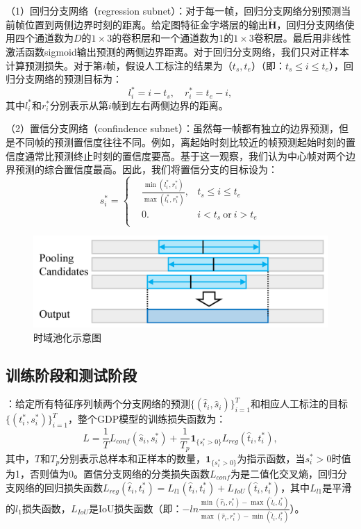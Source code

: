 （1）回归分支网络（regression subnet）：对于每一帧，回归分支网络分别预测当前帧位置到两侧边界时刻的距离。给定图特征金字塔层的输出$\tilde{\bm{H}}$，回归分支网络使用四个通道数为$D$的$1\times3$的卷积层和一个通道数为1的$1\times3$卷积层。最后用非线性激活函数sigmoid输出预测的两侧边界距离。对于回归分支网络，我们只对正样本计算预测损失。对于第$i$帧，假设人工标注的结果为（$t_s, t_e$）（即：$t_s \leq i \leq t_e$），回归分支网络的预测目标为：
\begin{equation}
    l^*_i = i - t_s, \quad r^*_i = t_e - i,
\end{equation}
其中$l^*_i$和$r^*_i$分别表示从第$i$帧到左右两侧边界的距离。

（2）置信分支网络（confindence subnet）：虽然每一帧都有独立的边界预测，但是不同帧的预测置信度往往不同。例如，离起始时刻比较近的帧预测起始时刻的置信度通常比预测终止时刻的置信度要高。基于这一观察，我们认为中心帧对两个边界预测的综合置信度最高。因此，我们将置信分支的目标设为：
\begin{equation}
s^*_i=\left\{
    \begin{aligned}
        & \frac{\min(l^*_i, r^*_i)}{\max(l^*_i, r^*_i)}, & t_s \leq i \leq t_e \\
        & 0.  & i < t_s ~\text{or}~ i > t_e \\
    \end{aligned}
    \right.
\end{equation}

\begin{figure}[t]
    \centering
    \includegraphics[width=0.8\linewidth]{chapter6/res/temporal_pooling.pdf}
    \caption{时域池化示意图}
    \label{ch6:fig:temporal_pooling}
\end{figure}

\subsection{训练阶段和测试阶段}

\textbf{}：给定所有特征序列帧两个分支网络的预测$\{(\hat{t}_i, \hat{s}_i)\}^T_{i=1}$和相应人工标注的目标$\{(t^*_i, s^*_i)\}^T_{i=1}$，整个GDP模型的训练损失函数为：
\begin{equation}
    L = \frac{1}{T}L_{conf}(\hat{s}_i, s^*_i) + \frac{1}{T_p}\mathbf{1}_{\{s^*_i>0\}}L_{reg}(\hat{t}_i, t^*_i),
\end{equation}
其中，$T$和$T_p$分别表示总样本和正样本的数量，$\mathbf{1}_{\{s^*_i>0\}}$为指示函数，当$s^*_i>0$时值为1，否则值为0。置信分支网络的分类损失函数$L_{conf}$为是二值化交叉熵，回归分支网络的回归损失函数$L_{reg}(\hat{t}_i, t^*_i) = L_{l1}(\hat{t}_i, t^*_i) + L_{IoU}(\hat{t}_i, t^*_i)$，其中$L_{l1}$是平滑的$l_1$损失函数，$L_{IoU}$是IoU损失函数（即：$-ln\frac{\min(\hat{r}_i, r^*_i)-\max(\hat{l}_i, l^*_i)}{\max(\hat{r}_i, r^*_i)-\min(\hat{l}_i, l^*_i)}$）。


